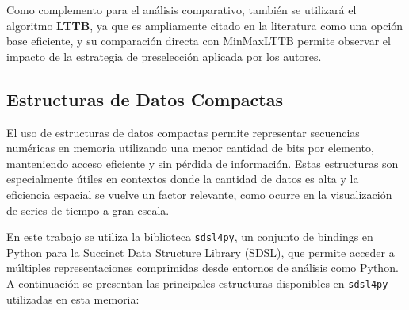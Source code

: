 Como complemento para el análisis comparativo, también se utilizará el algoritmo \textbf{LTTB}, ya que es ampliamente citado en la literatura como una opción base eficiente, y su comparación directa con MinMaxLTTB permite observar el impacto de la estrategia de preselección aplicada por los autores.

\subsection{Estructuras de Datos Compactas}

El uso de estructuras de datos compactas permite representar secuencias numéricas en memoria utilizando una menor cantidad de bits por elemento, manteniendo acceso eficiente y sin pérdida de información. Estas estructuras son especialmente útiles en contextos donde la cantidad de datos es alta y la eficiencia espacial se vuelve un factor relevante, como ocurre en la visualización de series de tiempo a gran escala.

En este trabajo se utiliza la biblioteca \texttt{sdsl4py}, un conjunto de bindings en Python para la Succinct Data Structure Library (SDSL), que permite acceder a múltiples representaciones comprimidas desde entornos de análisis como Python. A continuación se presentan las principales estructuras disponibles en \texttt{sdsl4py} utilizadas en esta memoria:

